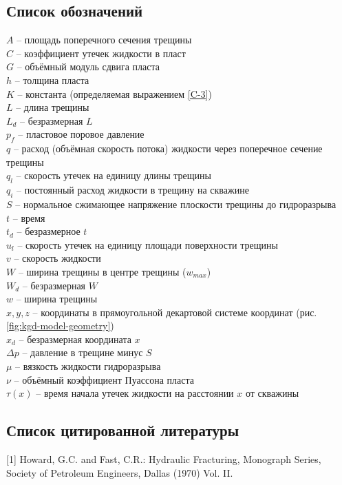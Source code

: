 \documentclass[a4paper, 11pt]{article}
\begin{document}
\subsection{Список обозначений}
\setlength{\parindent}{0pt}
$A$ -- площадь поперечного сечения трещины\\
$C$ -- коэффициент утечек жидкости в пласт\\
$G$ -- объёмный модуль сдвига пласта\\
$h$ -- толщина пласта\\
$K$ -- константа (определяемая выражением \eqref{C-3})\\
$L$ -- длина трещины\\
$L_d$ -- безразмерная $L$\\
$p_f$ -- пластовое поровое давление\\
$q$ -- расход (объёмная скорость потока) жидкости через поперечное сечение трещины\\
$q_l$ -- скорость утечек на единицу длины трещины\\
$q_i$ -- постоянный расход жидкости в трещину на скважине\\
$S$ -- нормальное сжимающее напряжение плоскости трещины до гидроразрыва\\
$t$ -- время\\
$t_d$ -- безразмерное $t$\\
$u_l$ -- скорость утечек на единицу площади поверхности трещины\\
$v$ -- скорость жидкости\\
$W$ -- ширина трещины в центре трещины ($w_{max}$)\\
$W_d$ -- безразмерная $W$\\
$w$ -- ширина трещины\\
$x,y,z$ -- координаты в прямоугольной декартовой системе координат (рис. \ref{fig:kgd-model-geometry})\\
$x_d$ -- безразмерная координата $x$\\
$\Delta p$ -- давление в трещине минус $S$\\
$\mu$ -- вязкость жидкости гидроразрыва\\
$\nu$ -- объёмный коэффициент Пуассона пласта\\
$\tau(x)$ -- время начала утечек жидкости на расстоянии $x$ от скважины
\setlength{\parindent}{20pt}

\subsection{Список цитированной литературы}
\setlength{\parindent}{0pt}
[1] Howard, G.C. and Fast, C.R.: Hydraulic Fracturing, Monograph Series, Society of Petroleum Engineers, Dallas (1970) Vol. II.
\end{document}
